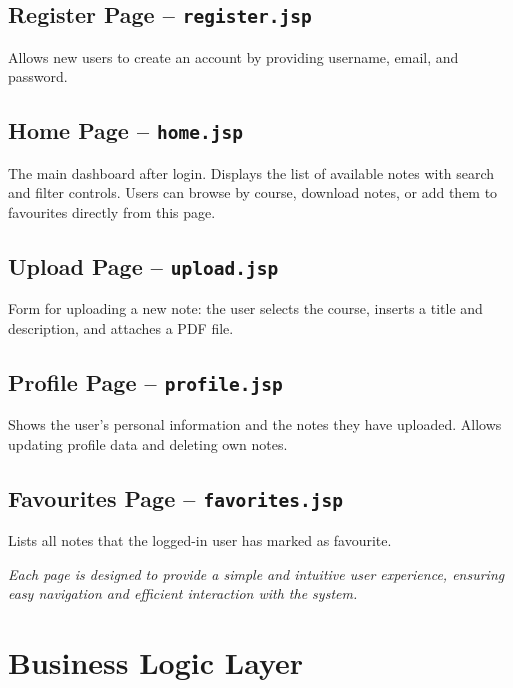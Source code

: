 \documentclass[12pt, a4paper]{article}
\begin{document}
    \subsection{Register Page -- \texttt{register.jsp}}
    Allows new users to create an account by providing username, email, and password.

    \subsection{Home Page -- \texttt{home.jsp}}
    The main dashboard after login. Displays the list of available notes with
    search and filter controls. Users can browse by course, download notes,
    or add them to favourites directly from this page.

    \subsection{Upload Page -- \texttt{upload.jsp}}
    Form for uploading a new note: the user selects the course, inserts a title
    and description, and attaches a PDF file.

    \subsection{Profile Page -- \texttt{profile.jsp}}
    Shows the user's personal information and the notes they have uploaded.
    Allows updating profile data and deleting own notes.

    \subsection{Favourites Page -- \texttt{favorites.jsp}}
    Lists all notes that the logged-in user has marked as favourite.

    \vspace{1cm}

    \begin{center}
        \textit{Each page is designed to provide a simple and intuitive user experience,
            ensuring easy navigation and efficient interaction with the system.}
    \end{center}

    \newpage
    \section{Business Logic Layer}
\end{document}
